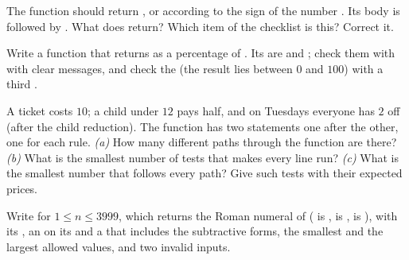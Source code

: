 \begin{exercise}[$\star\star$]\label{exo:g10:specifications-and-tests:10}
The function  should return ,  or  according to the sign of the number
. Its body is  followed by . What does
 return? Which item of the checklist is this? Correct it.
\end{exercise}

\begin{exercise}[$\star\star$]\label{exo:g10:specifications-and-tests:11}
Write a function  that returns  as a percentage of . Its
 are  and ; check them with  with clear messages, and
check the  (the result lies between $0$ and $100$) with a third .
\end{exercise}

\begin{exercise}[$\star\star\star$]\label{exo:g10:specifications-and-tests:12}
A ticket costs $10$; a child under $12$ pays half, and on Tuesdays everyone has $2$ off (after the child
reduction). The function has two  statements one after the other, one for each rule. \emph{(a)} How many
different paths through the function are there? \emph{(b)} What is the smallest number of tests that makes every
line run? \emph{(c)} What is the smallest number that follows every path? Give such tests with their expected
prices.
\end{exercise}

\begin{exercise}[$\star\star\star$]\label{exo:g10:specifications-and-tests:13}
Write  for $1 \le n \le 3999$, which returns the Roman numeral of  ( is ,
 is ,  is ), with its , an  on its  and a
 that includes the subtractive forms, the smallest and the largest allowed values, and two invalid inputs.
\end{exercise}

